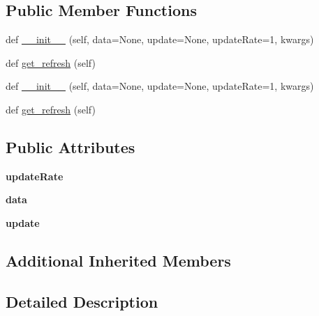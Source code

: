 \subsection*{Public Member Functions}
\begin{DoxyCompactItemize}
\item 
def \hyperlink{classremi_1_1gui_1_1PlotlyWidget_a47d74cb012f2672d376bec9d5590d66f}{\+\_\+\+\_\+init\+\_\+\+\_\+} (self, data=None, update=None, update\+Rate=1, kwargs)
\item 
def \hyperlink{classremi_1_1gui_1_1PlotlyWidget_a4f60413e7ccbf862ea550833a2e655de}{get\+\_\+refresh} (self)
\item 
def \hyperlink{classremi_1_1gui_1_1PlotlyWidget_a47d74cb012f2672d376bec9d5590d66f}{\+\_\+\+\_\+init\+\_\+\+\_\+} (self, data=None, update=None, update\+Rate=1, kwargs)
\item 
def \hyperlink{classremi_1_1gui_1_1PlotlyWidget_a4f60413e7ccbf862ea550833a2e655de}{get\+\_\+refresh} (self)
\end{DoxyCompactItemize}
\subsection*{Public Attributes}
\begin{DoxyCompactItemize}
\item 
{\bfseries update\+Rate}\hypertarget{classremi_1_1gui_1_1PlotlyWidget_a859657c72901e43186e8ee087f7de8b8}{}\label{classremi_1_1gui_1_1PlotlyWidget_a859657c72901e43186e8ee087f7de8b8}

\item 
{\bfseries data}\hypertarget{classremi_1_1gui_1_1PlotlyWidget_ab7b0229a3ef7507db216089373d69d7b}{}\label{classremi_1_1gui_1_1PlotlyWidget_ab7b0229a3ef7507db216089373d69d7b}

\item 
{\bfseries update}\hypertarget{classremi_1_1gui_1_1PlotlyWidget_a9c92bc099e1f287354327c85e03873ed}{}\label{classremi_1_1gui_1_1PlotlyWidget_a9c92bc099e1f287354327c85e03873ed}

\end{DoxyCompactItemize}
\subsection*{Additional Inherited Members}


\subsection{Detailed Description}
\begin{DoxyVerb}\end{DoxyVerb}
 

